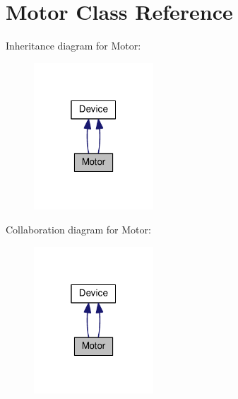 \hypertarget{class_motor}{}\section{Motor Class Reference}
\label{class_motor}


Inheritance diagram for Motor\+:
\nopagebreak
\begin{figure}[H]
\begin{center}
\leavevmode
\includegraphics[width=127pt]{class_motor__inherit__graph}
\end{center}
\end{figure}


Collaboration diagram for Motor\+:
\nopagebreak
\begin{figure}[H]
\begin{center}
\leavevmode
\includegraphics[width=127pt]{class_motor__coll__graph}
\end{center}
\end{figure}
